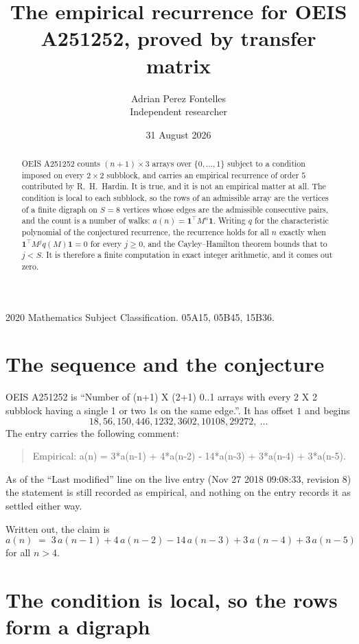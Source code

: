 \documentclass[11pt,a4paper]{article}
\title{The empirical recurrence for OEIS A251252, proved by transfer matrix}
\author{Adrian Perez Fontelles\\ \small Independent researcher}
\date{31 August 2026}
\theoremstyle{plain}
\theoremstyle{definition}
\begin{document}
\maketitle

\begin{abstract}
OEIS A251252 counts $(n+1)\times3$ arrays over $\{0,\dots,1\}$ subject to a condition imposed on
every $2\times2$ subblock, and carries an empirical recurrence of order $5$ contributed
by R.~H.~Hardin. It is true, and it is not an empirical matter at all. The condition is local
to each subblock, so the rows of an admissible array are the vertices of a finite digraph
on $S=8$ vertices whose edges are the admissible consecutive pairs, and the count is a
number of walks: $a(n)=\mathbf{1}^{\!\top}M^{n}\mathbf{1}$. Writing $q$
for the characteristic polynomial of the conjectured recurrence, the recurrence holds for all
$n$ exactly when $\mathbf{1}^{\!\top}M^{j}q(M)\mathbf{1}=0$ for every $j\ge0$, and the
Cayley--Hamilton theorem bounds that to $j<S$. It is therefore a finite computation in exact
integer arithmetic, and it comes out zero.
\end{abstract}

\noindent\small 2020 Mathematics Subject Classification. 05A15, 05B45, 15B36.\normalsize

\section{The sequence and the conjecture}

OEIS A251252 is ``Number of (n+1) X (2+1) 0..1 arrays with every 2 X 2 subblock having a single 1 or two 1s on the same edge.''. It has offset $1$ and begins
\[
18, 56, 150, 446, 1232, 3602, 10108, 29272,\ \dots
\]
The entry carries the following comment:
\begin{quote}\small
Empirical: a(n) = 3*a(n-1) + 4*a(n-2) - 14*a(n-3) + 3*a(n-4) + 3*a(n-5).
\end{quote}
As of the ``Last modified'' line on the live entry (Nov 27 2018 09:08:33, revision 8) the statement is
still recorded as empirical, and nothing on the entry records it as settled either way.

Written out, the claim is
\begin{equation}\label{eq:conj}
a(n)\;=\;3\,a(n-1) + 4\,a(n-2) - 14\,a(n-3) + 3\,a(n-4) + 3\,a(n-5)
\end{equation}
for all $n>4$.

\section{The condition is local, so the rows form a digraph}
\end{document}
